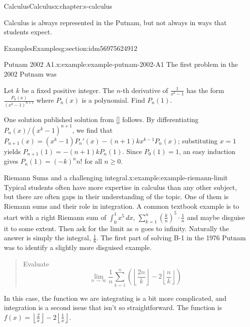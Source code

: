 \documentclass[twoside,10pt,]{book}
\newcommand{\xreffont}{\relax}
\numberwithin{equation}{section}
\begin{document}
\begin{chapterptx}{Calculus}{}{Calculus}{}{}{x:chapter:s-calculus}
\begin{introduction}{}%
Calculus is always represented in the Putnam, but not always in ways that students expect.%
\end{introduction}%
%
%
\typeout{************************************************}
\typeout{************************************************}
%
\begin{sectionptx}{Examples}{}{Examples}{}{}{g:section:idm56975624912}
\begin{example}{Putnam 2002 A1.}{x:example:example-putnam-2002-A1}%
The first problem in the 2002 Putnam was%
\par
Let \(k\) be a fixed positive integer. The \(n\)-th derivative of \(\frac{1}{x^k - 1}\) has the form \(\frac{P_n(x)}{(x^k - 1)^{n+1}}\) where \(P_n(x)\) is a polynomial. Find \(P_n(1)\).%
\par
One solution published solution from \hyperlink{x:biblio:biblio-putnam-archive}{[{\xreffont 10}]} follows.  By differentiating \(P_n(x)/(x^k-1)^{n+1}\), we find that \(P_{n+1}(x) = (x^k-1)P_n'(x)-(n+1)kx^{k-1}P_n(x)\); substituting \(x=1\) yields \(P_{n+1}(1) = -(n+1)k P_n(1)\).  Since \(P_0(1)=1\), an easy induction gives \(P_n(1) = (-k)^n n!\) for all \(n \geq 0\).%
\end{example}
\begin{example}{Riemann Sums and a challenging integral.}{x:example:example-riemann-limit}%
%
Typical students often have more expertise in calculus than any other subject, but there are often gaps in their understanding of the topic.  One of them is Riemann sums and their role in integration.  A common textbook example is to start with a right Riemann sum of \(\int_0^1 x^5 \, dx\), \(\sum _{k=1}^n \left(\frac{k}{n}\right)^5 \cdot \frac{1}{n}\) and maybe disguise it to some extent.  Then ask for the limit as \(n\) goes to infinity.  Naturally the answer is simply the integral, \(\frac{1}{6}\).   The first part of solving B-1 in the 1976 Putnam was to identify a slightly more disguised example.%
\begin{quote}%
Evaluate%
\begin{equation*}
\lim_{n\to\infty} \frac{1}{n} \sum _{k=1}^n \left(\left\lfloor
\frac{2 n}{k}\right\rfloor -2
\left\lfloor
\frac{n}{k}\right\rfloor \right) 
\end{equation*}
%
\end{quote}
In this case, the function we are integrating is a bit more complicated, and integration is a second issue that isn't so straightforward.  The function is \(f(x)= \left\lfloor \frac{2}{x}\right\rfloor - 2 \left\lfloor \frac{1}{x}\right\rfloor\).%

\end{example}
\end{sectionptx}
\end{chapterptx}
\end{document}
